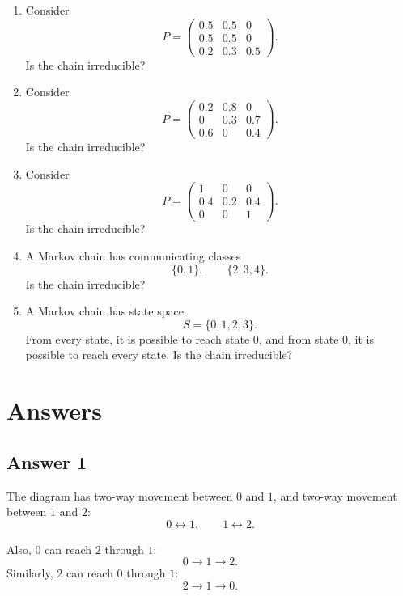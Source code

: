 \documentclass[12pt,a4paper]{article}
\theoremstyle{notestyle}
\begin{document}
\begin{enumerate}[label=\textbf{Q\arabic*.}, leftmargin=1.2cm]
    Is the chain irreducible?

    \item Consider
    \[
    P=
    \begin{pmatrix}
    0.5 & 0.5 & 0\\
    0.5 & 0.5 & 0\\
    0.2 & 0.3 & 0.5
    \end{pmatrix}.
    \]
    Is the chain irreducible?

    \item Consider
    \[
    P=
    \begin{pmatrix}
    0.2 & 0.8 & 0\\
    0 & 0.3 & 0.7\\
    0.6 & 0 & 0.4
    \end{pmatrix}.
    \]
    Is the chain irreducible?

    \item Consider
    \[
    P=
    \begin{pmatrix}
    1 & 0 & 0\\
    0.4 & 0.2 & 0.4\\
    0 & 0 & 1
    \end{pmatrix}.
    \]
    Is the chain irreducible?

    \item A Markov chain has communicating classes
    \[
    \{0,1\},\qquad \{2,3,4\}.
    \]
    Is the chain irreducible?

    \item A Markov chain has state space
    \[
    S=\{0,1,2,3\}.
    \]
    From every state, it is possible to reach state $0$, and from state $0$, it is possible to reach every state. Is the chain irreducible?
\end{enumerate}

\section{Answers}

\subsection*{Answer 1}

The diagram has two-way movement between $0$ and $1$, and two-way movement between $1$ and $2$:
\[
0\leftrightarrow 1,
\qquad
1\leftrightarrow 2.
\]

Also, $0$ can reach $2$ through $1$:
\[
0\to 1\to 2.
\]
Similarly, $2$ can reach $0$ through $1$:
\[
2\to 1\to 0.
\]
\end{document}
